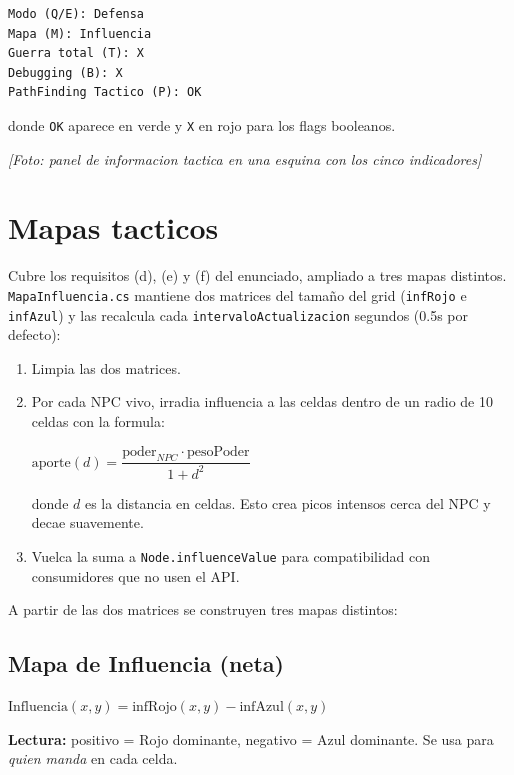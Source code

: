 \documentclass[12pt,a4paper]{article}
\newcommand{\fotoplaceholder}[1]{%
    \par\medskip\noindent%
    \begin{center}%
    \begin{tcolorbox}[
        colback=fotobg,
        colframe=fotoborder,
        boxrule=0.8pt,
        arc=2pt,
        width=0.85\textwidth,
        halign=center,
        valign=center,
        height=2.4cm
    ]
    \itshape\color{gray} [Foto: #1]
    \end{tcolorbox}%
    \end{center}\medskip%
}
\begin{document}
\begin{verbatim}
Modo (Q/E): Defensa
Mapa (M): Influencia
Guerra total (T): X
Debugging (B): X
PathFinding Tactico (P): OK
\end{verbatim}

donde \texttt{OK} aparece en verde y \texttt{X} en rojo para los flags
booleanos.

\fotoplaceholder{panel de informacion tactica en una esquina con los cinco indicadores}

\section{Mapas tacticos}

Cubre los requisitos (d), (e) y (f) del enunciado, ampliado a tres
mapas distintos. \texttt{MapaInfluencia.cs} mantiene dos matrices del
tamaño del grid (\texttt{infRojo} e \texttt{infAzul}) y las recalcula
cada \texttt{intervaloActualizacion} segundos (0.5s por defecto):

\begin{enumerate}[leftmargin=1.5em]
    \item Limpia las dos matrices.
    \item Por cada NPC vivo, irradia influencia a las celdas dentro de un radio de 10 celdas con la formula:
    \begin{formulabox}
    \centering
    $\text{aporte}(d) = \dfrac{\text{poder}_{NPC} \cdot \text{pesoPoder}}{1 + d^2}$
    \end{formulabox}
    donde $d$ es la distancia en celdas. Esto crea picos intensos cerca del NPC y decae suavemente.
    \item Vuelca la suma a \texttt{Node.influenceValue} para compatibilidad con consumidores que no usen el API.
\end{enumerate}

A partir de las dos matrices se construyen tres mapas distintos:

\subsection{Mapa de Influencia (neta)}

\begin{formulabox}
\centering
$\text{Influencia}(x,y) = \text{infRojo}(x,y) - \text{infAzul}(x,y)$
\end{formulabox}

\textbf{Lectura:} positivo = Rojo dominante, negativo = Azul dominante.
Se usa para \emph{quien manda} en cada celda.
\end{document}
